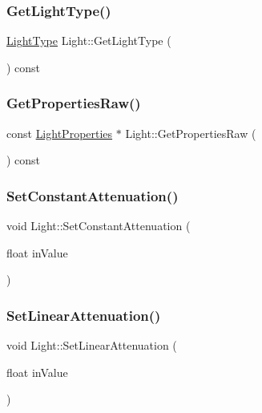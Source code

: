 \subsubsection{\texorpdfstring{Get\+Light\+Type()}{GetLightType()}}
{\footnotesize\ttfamily \hyperlink{class_light_a661d9480e01af8b1612860b9630ef5f8}{Light\+Type} Light\+::\+Get\+Light\+Type (\begin{DoxyParamCaption}{ }\end{DoxyParamCaption}) const\hspace{0.3cm}{\ttfamily [inline]}}

\hypertarget{class_light_a1d2283dacdef30df671d55b7dc415851}{}\label{class_light_a1d2283dacdef30df671d55b7dc415851}
\subsubsection{\texorpdfstring{Get\+Properties\+Raw()}{GetPropertiesRaw()}}
{\footnotesize\ttfamily const \hyperlink{struct_light_properties}{Light\+Properties} $\ast$ Light\+::\+Get\+Properties\+Raw (\begin{DoxyParamCaption}{ }\end{DoxyParamCaption}) const}

\hypertarget{class_light_aec7f3864e328bc9fada51fdb3e8a7c8e}{}\label{class_light_aec7f3864e328bc9fada51fdb3e8a7c8e}
\subsubsection{\texorpdfstring{Set\+Constant\+Attenuation()}{SetConstantAttenuation()}}
{\footnotesize\ttfamily void Light\+::\+Set\+Constant\+Attenuation (\begin{DoxyParamCaption}\item[{float}]{in\+Value }\end{DoxyParamCaption})}

\hypertarget{class_light_aa33086ed4bff3ac95c700698b3070108}{}\label{class_light_aa33086ed4bff3ac95c700698b3070108}
\subsubsection{\texorpdfstring{Set\+Linear\+Attenuation()}{SetLinearAttenuation()}}
{\footnotesize\ttfamily void Light\+::\+Set\+Linear\+Attenuation (\begin{DoxyParamCaption}\item[{float}]{in\+Value }\end{DoxyParamCaption})}


